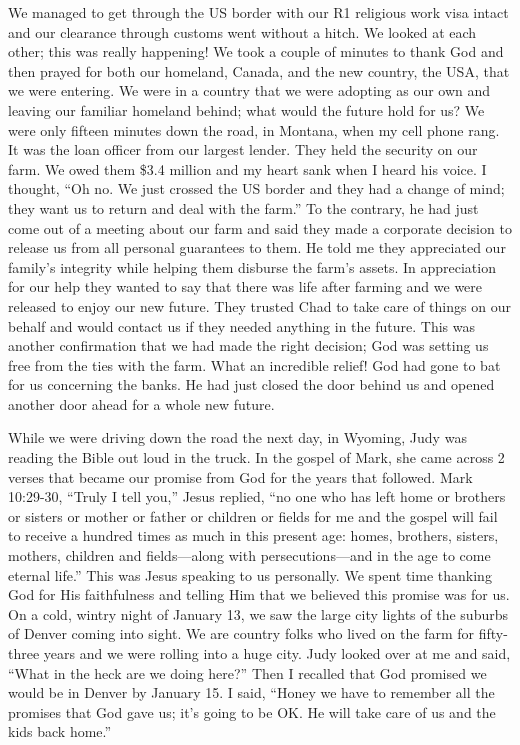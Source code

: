 \documentclass[oneside]{book}
\begin{document}
We managed to get through the US border with our R1 religious work visa intact and our clearance through customs went without a hitch. We looked at each other; this was really happening! We took a couple of minutes to thank God and then prayed for both our homeland, Canada, and the new country, the USA, that we were entering.  We were in a country that we were adopting as our own and leaving our familiar homeland behind; what would the future hold for us? We were only fifteen minutes down the road, in Montana, when my cell phone rang. It was the loan officer from our largest lender. They held the security on our farm. We owed them \$3.4 million and my heart sank when I heard his voice. I thought, “Oh no. We just crossed the US border and they had a change of mind; they want us to return and deal with the farm.” To the contrary, he had just come out of a meeting about our farm and said they made a corporate decision to release us from all personal guarantees to them. He told me they appreciated our family’s integrity while helping them disburse the farm’s assets. In appreciation for our help they wanted to say that there was life after farming and we were released to enjoy our new future. They trusted Chad to take care of things on our behalf and would contact us if they needed anything in the future. This was another confirmation that we had made the right decision; God was setting us free from the ties with the farm. What an incredible relief! God had gone to bat for us concerning the banks. He had just closed the door behind us and opened another door ahead for a whole new future.

While we were driving down the road the next day, in Wyoming, Judy was reading the Bible out loud in the truck. In the gospel of Mark, she came across 2 verses that became our promise from God for the years that followed. Mark 10:29-30, “Truly I tell you,” Jesus replied, “no one who has left home or brothers or sisters or mother or father or children or fields for me and the gospel will fail to receive a hundred times as much in this present age: homes, brothers, sisters, mothers, children and fields—along with persecutions—and in the age to come eternal life.” This was Jesus speaking to us personally. We spent time thanking God for His faithfulness and telling Him that we  believed this promise was for us. On a cold, wintry night of January 13, we saw the large city lights of the suburbs of Denver coming into sight. We are country folks who lived on the farm for fifty-three years and we were rolling into a huge city. Judy looked over at me and said, “What in the heck are we doing here?” Then I recalled that God promised we would be in Denver by January 15. I said, “Honey we have to remember all the promises that God gave us; it’s going to be OK. He will take care of us and the kids back home.”  
\end{document}
